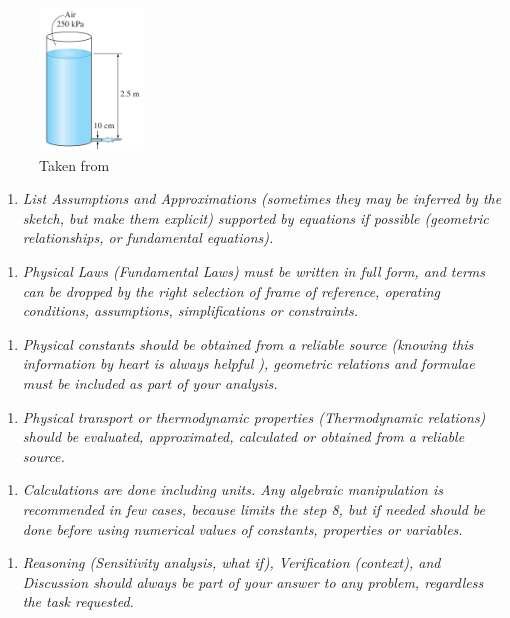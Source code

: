 \documentclass{article}
\begin{document}
\begin{figure}[h!]
\centering
\includegraphics[width=0.25\textwidth]{./img/FIGUREBernoulliEquation.png}
\caption{Taken from \cite{Cengel2017}}
\label{fig_FIGUREBernoulliEquation}
\end{figure}

\begin{enumerate}[resume]
\item \textit{List Assumptions and Approximations (sometimes they may be inferred by the sketch, but make them explicit) supported by equations if possible (geometric relationships, or fundamental equations).}
\end{enumerate}



\begin{enumerate}[resume]
\item \textit{Physical Laws (Fundamental Laws) must be written in full form, and terms can be dropped by the right selection of frame of reference, operating conditions, assumptions, simplifications or constraints.}
\end{enumerate}



\begin{enumerate}[resume]
\item \textit{Physical constants should be obtained from a reliable source (knowing this information by heart is always helpful ), geometric relations and formulae must be included as part of your analysis.}
\end{enumerate}



\begin{enumerate}[resume]
\item \textit{Physical transport or thermodynamic properties (Thermodynamic relations) should be evaluated, approximated, calculated or obtained from a reliable source.}
\end{enumerate}



\begin{enumerate}[resume]
\item \textit{Calculations are done including units. Any algebraic manipulation is recommended in few cases, because limits the step 8, but if needed should be done before using numerical values of constants, properties or variables.}
\end{enumerate}



\begin{enumerate}[resume]
\item \textit{Reasoning (Sensitivity analysis, what if), Verification (context), and Discussion should always be part of your answer to any problem, regardless the task requested.}
\end{enumerate}



\printbibliography[title={References}]
\end{document}
